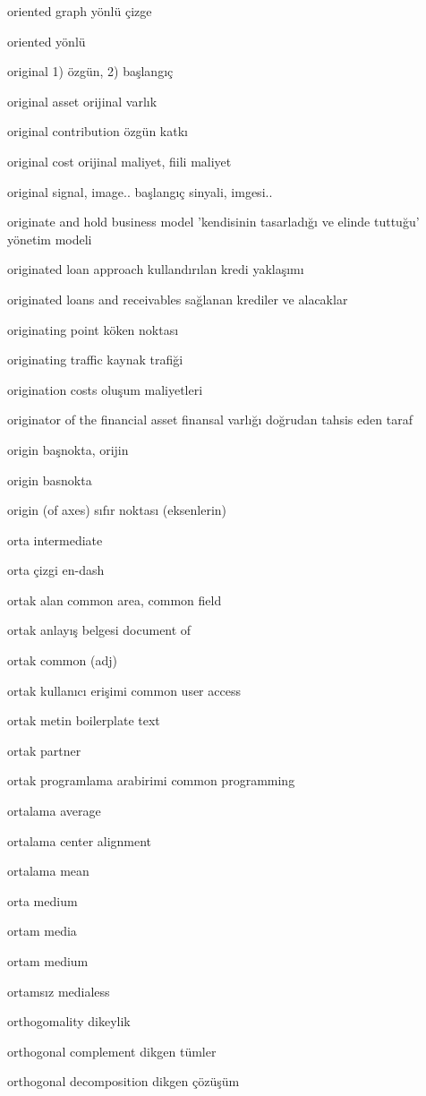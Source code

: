 \documentclass[12pt,fleqn]{article}\usepackage{../../common}
\begin{document}
oriented graph yönlü çizge

oriented yönlü

original 1) özgün, 2) başlangıç

original asset orijinal varlık

original contribution özgün katkı

original cost orijinal maliyet, fiili maliyet

original signal, image.. başlangıç sinyali, imgesi..

originate and hold business model 'kendisinin tasarladığı ve elinde tuttuğu' yönetim modeli

originated loan approach kullandırılan kredi yaklaşımı

originated loans and receivables sağlanan krediler ve alacaklar

originating point köken noktası

originating traffic kaynak trafiği

origination costs oluşum maliyetleri

originator of the financial asset finansal varlığı doğrudan tahsis eden taraf

origin başnokta, orijin

origin basnokta

origin (of axes) sıfır noktası (eksenlerin)

orta intermediate

orta çizgi en-dash

ortak alan common area, common field

ortak anlayış belgesi document of

ortak common (adj)

ortak kullanıcı erişimi common user access

ortak metin boilerplate text

ortak partner

ortak programlama arabirimi common programming

ortalama average

ortalama center alignment

ortalama mean

orta medium

ortam media

ortam medium

ortamsız medialess

orthogomality dikeylik

orthogonal complement dikgen tümler

orthogonal decomposition dikgen çözüşüm
\end{document}
